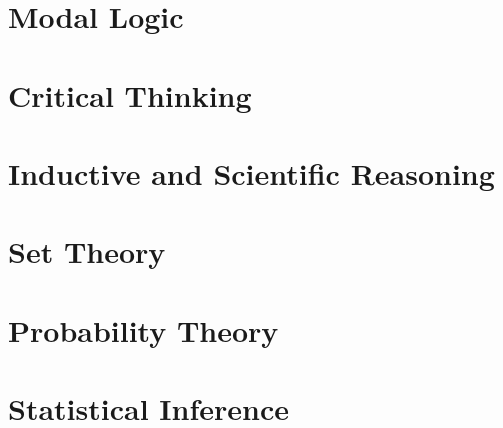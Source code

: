 \documentclass[nobib]{tufte-book}
\begin{document}
\part{Modal Logic}\label{part:modal_logic}
%
%
%
%
%

\part{Critical Thinking}\label{part:critical_thinking}

%
%
%
%
%
%
%
%

\part{Inductive and Scientific Reasoning}\label{part:inductive_scientific}

%
%
%
%
%
%
%
%

\part{Set Theory}\label{part:set_theory}


%
%
%


\part{Probability Theory}\label{part:probability}





\part{Statistical Inference}\label{part:statistics}
%
%
%
%
%
\end{document}
